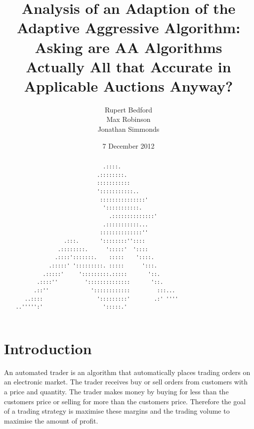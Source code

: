 \documentclass[preprint]{acm_proc_article-sp} %
\begin{document}
\title{Analysis of an Adaption of the Adaptive Aggressive Algorithm: Asking are AA Algorithms Actually All that Accurate in Applicable Auctions Anyway?}
\author{
  \alignauthor
    Rupert Bedford\\
  \alignauthor
    Max Robinson\\
  \alignauthor
    Jonathan Simmonds
}
\date{7 December 2012}

\maketitle
\begin{abstract} \label{sec:abstract}
\begin{verbatim}
                             .::::. 
                           .::::::::. 
                           ::::::::::: 
                           ':::::::::::.. 
                            :::::::::::::::' 
                             ':::::::::::. 
                               .::::::::::::::' 
                             .:::::::::::... 
                            ::::::::::::::'' 
                .:::.       '::::::::'':::: 
              .::::::::.      ':::::'  ':::: 
             .::::':::::::.    :::::    '::::. 
           .:::::' ':::::::::. :::::      ':::. 
         .:::::'     ':::::::::.:::::       '::. 
       .::::''         '::::::::::::::       '::. 
      .::''              '::::::::::::         :::... 
   ..::::                  ':::::::::'        .:' '''' 
..''''':'                    ':::::.' 
\end{verbatim}
\end{abstract}

\pagebreak

\section{Introduction} \label{sec:introduction}

An automated trader is an algorithm that automatically places trading orders on
an electronic market.
The trader receives buy or sell orders from customers with a price and
quantity.
The trader makes money by buying for less than the customers price or selling
for more than the customers price.
Therefore the goal of a trading strategy is maximise these margins and the
trading volume to maximise the amount of profit.
\end{document}
